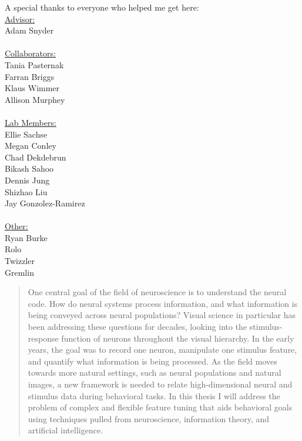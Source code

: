 \documentclass[
11pt, %
english, %
doublespacing, %
nolistspacing, %
headsepline, %
]{MastersDoctoralThesis} %
\begin{document}
\begin{acknowledgements}
	A special thanks to everyone who helped me get here:\\
	\underline{Advisor:} \\
	Adam Snyder \\
	\\
	\underline{Collaborators:} \\
	Tania Pasternak \\
	Farran Briggs \\
	Klaus Wimmer \\
	Allison Murphey \\
	\\
	\underline{Lab Members:} \\
	Ellie Sachse \\
	Megan Conley \\
	Chad Dekdebrun \\
	Bikash Sahoo \\
	Dennis Jung \\
	Shizhao Liu \\
	Jay Gonzolez-Ramirez \\
	\\
	\underline{Other:}\\
	Ryan Burke \\
	Rolo \\
	Twizzler \\
	Gremlin \\
\end{acknowledgements}

\addchaptertocentry{\color{thesisBlue} \acknowledgementname}

\begin{abstract}
	
	One central goal of the field of neuroscience is to understand the neural code. How do neural systems process information, and what information is being conveyed across neural populations? Visual science in particular has been addressing these questions for decades, looking into the stimulus-response function of neurons throughout the visual hierarchy. In the early years, the goal was to record one neuron, manipulate one stimulus feature, and quantify what information is being processed. As the field moves towards more natural settings, such as neural populations and natural images, a new framework is needed to relate high-dimensional neural and stimulus data during behavioral tasks. In this thesis I will address the problem of complex and flexible feature tuning that aids behavioral goals using techniques pulled from neuroscience, information theory, and artificial intelligence.
\end{abstract}
\addchaptertocentry{\color{thesisBlue} \abstractname} %
\end{document}

